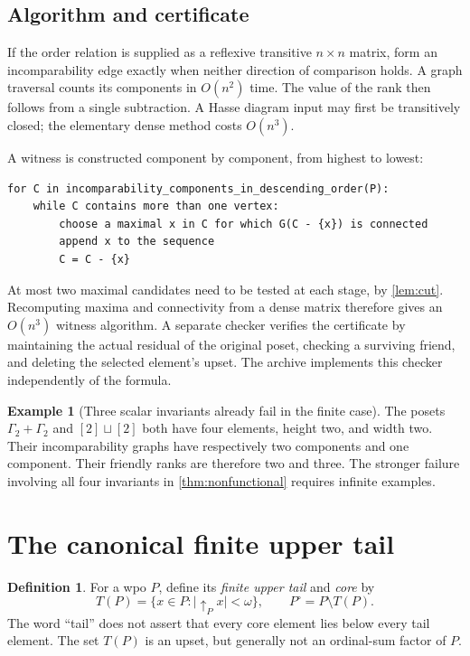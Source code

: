 \documentclass[11pt,a4paper]{article}
\theoremstyle{definition}
\newtheorem{definition}[definition]{Definition}
\newtheorem{example}[example]{Example}
\theoremstyle{remark}
\newcommand{\core}[1]{{#1}^{\circ}}
\newcommand{\tail}[1]{T(#1)}
\newcommand{\ds}{\mathbin{\sqcup}}
\begin{document}
\subsection{Algorithm and certificate}

If the order relation is supplied as a reflexive transitive $n\times n$
matrix, form an incomparability edge exactly when neither direction of
comparison holds. A graph traversal counts its components in $O(n^2)$
time. The value of the rank then follows from a single subtraction. A Hasse
diagram input may first be transitively closed; the elementary dense method
costs $O(n^3)$.

A witness is constructed component by component, from highest to lowest:
\begin{lstlisting}
for C in incomparability_components_in_descending_order(P):
    while C contains more than one vertex:
        choose a maximal x in C for which G(C - {x}) is connected
        append x to the sequence
        C = C - {x}
\end{lstlisting}

At most two maximal candidates need to be tested at each stage, by
\cref{lem:cut}. Recomputing maxima and connectivity from a dense matrix
therefore gives an $O(n^3)$ witness algorithm. A separate checker verifies
the certificate by maintaining the actual residual of the original poset,
checking a surviving friend, and deleting the selected element's upset.
The archive implements this checker independently of the formula.

\begin{example}[Three scalar invariants already fail in the finite case]
The posets $\Gamma_2+\Gamma_2$ and $[2]\ds[2]$ both have four elements,
height two, and width two. Their incomparability graphs have respectively
two components and one component. Their friendly ranks are therefore two
and three. The stronger failure involving all four invariants in
\cref{thm:nonfunctional} requires infinite examples.
\end{example}

\section{The canonical finite upper tail}\label{sec:tail}

\begin{definition}\label{def:tail}
For a wpo $P$, define its \emph{finite upper tail} and \emph{core} by
\[
\tail{P}=\{x\in P:|\uparrow_Px|<\omega\},\qquad
\core{P}=P\setminus\tail{P}.
\]
The word ``tail'' does not assert that every core element lies below every
tail element. The set $T(P)$ is an upset, but generally not an ordinal-sum
factor of $P$.
\end{definition}
\end{document}
